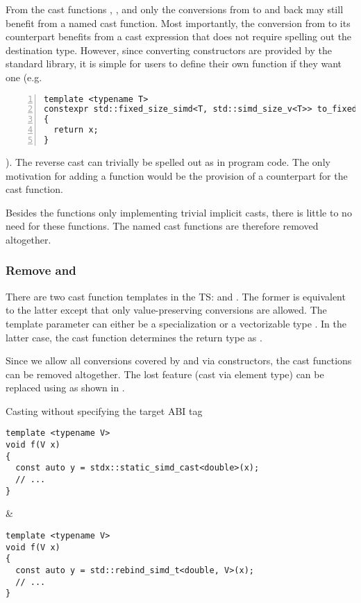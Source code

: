 From the cast functions \stdx{}, \stdx{}, and
\stdx{} only the conversions from \simdabi{} to \simdabi{} and back may still benefit from a named cast
function.
Most importantly, the conversion from  to its 
counterpart benefits from a cast expression that does not require spelling out
the destination type.
However, since converting constructors are provided by the standard library, it
is simple for users to define their own  function if they
want one (e.g.
\begin{lstlisting}[numbers=left,float={hbtp},label=lst:userdefined-to-fixed-size,caption={
  Example of a user-defined \code{to_fixed_size} implementation if explicit casts are provided
}]
template <typename T>
constexpr std::fixed_size_simd<T, std::simd_size_v<T>> to_fixed_size(std::simd<T> x)
{
  return x;
}
\end{lstlisting}
).
The reverse cast can trivially be spelled out as 
in program code.
The only motivation for adding a  function would be the
provision of a counterpart for the  cast function.

Besides the functions only implementing trivial implicit casts, there is little
to no need for these functions.
The named cast functions are therefore removed altogether.

\subsubsection{Remove  and }
There are two cast function templates in the TS:  and
.
The former is equivalent to the latter except that only value-preserving
conversions are allowed.
The template parameter can either be a  specialization or a
vectorizable type .
In the latter case, the cast function determines the return type as
.

Since we allow all conversions covered by \stdx{} and
\stdx{} via \std{} constructors, the cast
functions can be removed altogether.
The lost feature (cast via element type) can be replaced using
 as shown in .
\begin{tonytable}[Parallelism TS 2]{Casting without specifying the target ABI tag}\label{tt:tsvsp1928casts}
  \begin{lstlisting}
template <typename V>
void f(V x)
{
  const auto y = stdx::static_simd_cast<double>(x);
  // ...
}
  \end{lstlisting}
  &
  \begin{lstlisting}
template <typename V>
void f(V x)
{
  const auto y = std::rebind_simd_t<double, V>(x);
  // ...
}
  \end{lstlisting}
\end{tonytable}%

